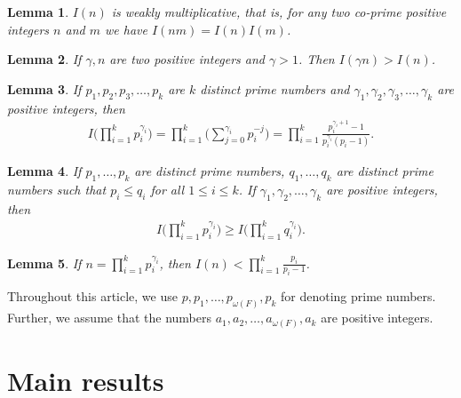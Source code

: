 \documentclass[11pt,twoside]{amsart}
\newtheorem{lemma}{Lemma}[section]
\begin{document}
\begin{lemma}\label{Lemma 2.1}
$I(n)$ is weakly multiplicative, that is, for any two co-prime positive integers $n$ and $m$ we have $I(nm)=I(n)I(m)$.
  \end{lemma}
 

\begin{lemma}\label{Lemma 2.2}
If $\gamma,n$ are two positive integers and $\gamma>1$. Then $I(\gamma n)>I(n)$.
\end{lemma}



\begin{lemma}\label{Lemma 2.3}
If $p_1, p_2,p_3,\dots,p_k$ are $k$ distinct prime numbers and $\gamma_1,\gamma_2,\gamma_3,\ldots,\gamma_k$ are positive integers, then
\begin{align*}
I\biggl (\prod_{i=1}^{k}p_i^{\gamma_i}\biggl)=\prod_{i=1}^{k}\biggl(\sum_{j=0}^{\gamma_i}p_i^{-j}\biggl)=\prod_{i=1}^{k}\frac{p_i^{\gamma_i+1}-1}{p_i^{\gamma_i}(p_i-1)}.
\end{align*}
\end{lemma}



\begin{lemma}\label{Lemma 2.4}
If $p_{1},\dots,p_{k}$ are distinct prime numbers, $q_{1},\ldots,q_{k}$ are distinct prime numbers such that  $p_{i}\leq q_{i}$ for all $1\leq i\leq k$. If $\gamma_1,\gamma_2,\dots,\gamma_k$ are positive integers, then
\begin{align*}
I \biggl(\prod_{i=1}^{k}p_i^{\gamma_i}\biggl)\geq I\biggl(\prod_{i=1}^{k}q_i^{\gamma_i}\biggl).
\end{align*}

 
\end{lemma}

 
\begin{lemma}\label{Lemma 2.5}
If $n=\displaystyle{\prod_{i=1}^{k}p_i^{\gamma_i}}$, then $\displaystyle{I(n)<\prod_{i=1}^{k}\frac{p_i}{p_i-1}}$.
\end{lemma}

Throughout this article, we use $p,p_1,\dots,p_{\omega(F)},p_k$ for denoting prime numbers. Further, we assume that the numbers $a_1,a_2,\dots,a_{\omega(F)},a_k$ are positive integers. 



\section {Main results}
\end{document}
